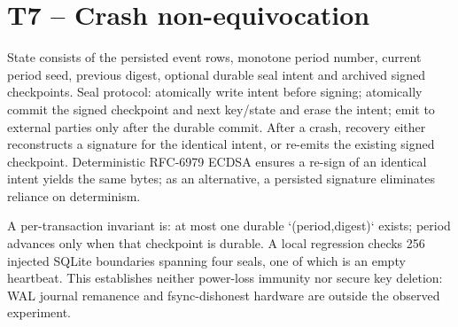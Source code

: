 \section*{T7 -- Crash non-equivocation}
State consists of the persisted event rows, monotone period number, current
period seed, previous digest, optional durable seal intent and archived
signed checkpoints. Seal protocol: atomically write intent before signing;
atomically commit the signed checkpoint and next key/state and erase the
intent; emit to external parties only after the durable commit. After a
crash, recovery either reconstructs a signature for the identical intent,
or re-emits the existing signed checkpoint. Deterministic RFC-6979 ECDSA
ensures a re-sign of an identical intent yields the same bytes; as an
alternative, a persisted signature eliminates reliance on determinism.

A per-transaction invariant is: at most one durable `(period,digest)` exists;
period advances only when that checkpoint is durable. A local regression
checks 256 injected SQLite boundaries spanning four seals, one of which is
an empty heartbeat. This establishes neither power-loss immunity nor
secure key deletion: WAL journal remanence and fsync-dishonest hardware are
outside the observed experiment.
